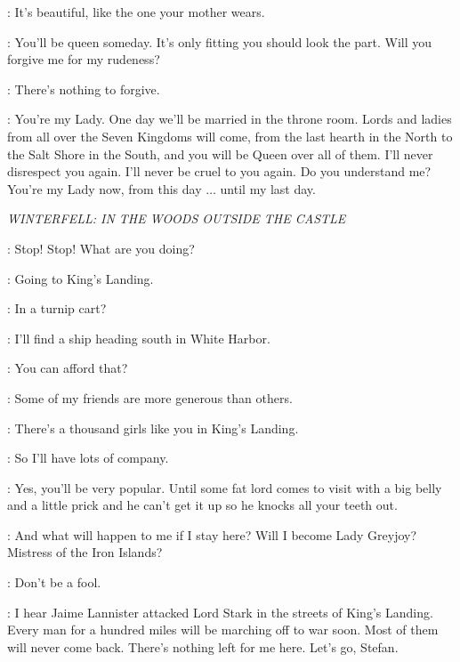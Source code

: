 
\SANSA: It's beautiful, like the one your mother wears. 

\JOFFREY: You'll be queen someday. It's only fitting you should look the part. Will you forgive me for my rudeness? 

\SANSA: There's nothing to forgive. 

\JOFFREY: You're my Lady. One day we'll be married in the throne room. Lords and ladies from all over the Seven Kingdoms will come, from the last hearth in the North to the Salt Shore in the South, and you will be Queen over all of them. I'll never disrespect you again. I'll never be cruel to you again. Do you understand me? You're my Lady now, from this day $\ldots$ until my last day. 


\scene

\textit{WINTERFELL: IN THE WOODS OUTSIDE THE CASTLE} 


\THEON: Stop! Stop! What are you doing? 

\ROS: Going to King's Landing. 

\THEON: In a turnip cart? 

\ROS: I'll find a ship heading south in White Harbor. 

\THEON: You can afford that? 

\ROS: Some of my friends are more generous than others. 

\THEON: There's a thousand girls like you in King's Landing. 

\ROS: So I'll have lots of company. 

\THEON: Yes, you'll be very popular. Until some fat lord comes to visit with a big belly and a little prick and he can't get it up so he knocks all your teeth out. 

\ROS: And what will happen to me if I stay here? Will I become Lady Greyjoy? Mistress of the Iron Islands? 

\THEON: Don't be a fool. 

\ROS: I hear Jaime Lannister attacked Lord Stark in the streets of King's Landing. Every man for a hundred miles will be marching off to war soon. Most of them will never come back. There's nothing left for me here.  Let's go, Stefan. 

